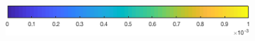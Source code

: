 \documentclass{article}
\begin{document}
\begin{figure}[htp]
\begin{subfigure}{.33\textwidth}
\end{subfigure}
\\[+0.2cm]
\begin{subfigure}{.5\textwidth}
 \includegraphics[width=0.95\linewidth]{../Separate_figures/ECOGEM/ocn_TDFe_clrbr.png}
\end{subfigure}
\end{figure}
\end{document}
